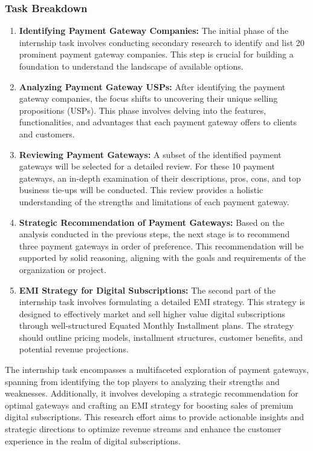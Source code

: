 \subsubsection{Task Breakdown}

\begin{enumerate}
    \item \textbf{Identifying Payment Gateway Companies:}
    The initial phase of the internship task involves conducting secondary research to identify and list 20 prominent payment gateway companies. This step is crucial for building a foundation to understand the landscape of available options.

    \item \textbf{Analyzing Payment Gateway USPs:}
    After identifying the payment gateway companies, the focus shifts to uncovering their unique selling propositions (USPs). This phase involves delving into the features, functionalities, and advantages that each payment gateway offers to clients and customers.

    \item \textbf{Reviewing Payment Gateways:}
    A subset of the identified payment gateways will be selected for a detailed review. For these 10 payment gateways, an in-depth examination of their descriptions, pros, cons, and top business tie-ups will be conducted. This review provides a holistic understanding of the strengths and limitations of each payment gateway.

    \item \textbf{Strategic Recommendation of Payment Gateways:}
    Based on the analysis conducted in the previous steps, the next stage is to recommend three payment gateways in order of preference. This recommendation will be supported by solid reasoning, aligning with the goals and requirements of the organization or project.

    \item \textbf{EMI Strategy for Digital Subscriptions:}
    The second part of the internship task involves formulating a detailed EMI strategy. This strategy is designed to effectively market and sell higher value digital subscriptions through well-structured Equated Monthly Installment plans. The strategy should outline pricing models, installment structures, customer benefits, and potential revenue projections.
\end{enumerate}

The internship task encompasses a multifaceted exploration of payment gateways, spanning from identifying the top players to analyzing their strengths and weaknesses. Additionally, it involves developing a strategic recommendation for optimal gateways and crafting an EMI strategy for boosting sales of premium digital subscriptions. This research effort aims to provide actionable insights and strategic directions to optimize revenue streams and enhance the customer experience in the realm of digital subscriptions.

